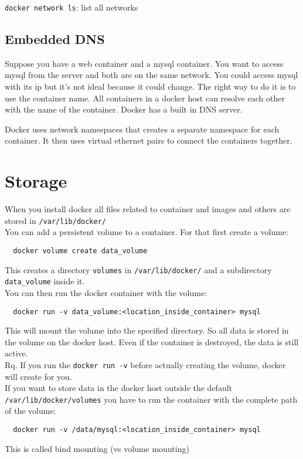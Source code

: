 \documentclass[french]{article}
\begin{document}
\verb|docker network ls|: list all networks

\subsection{Embedded DNS}

Suppose you have a web container and a mysql container. You want to access mysql from the server and both are on the same network. You could access mysql with its ip but it's not ideal because it could change. The right way to do it is to use the container name. All containers in a docker host can resolve each other with the name of the container. Docker has a built in DNS server.

Docker uses network namespaces that creates a separate namespace for each container. It then uses virtual ethernet pairs to connect the containers together.

\section{Storage}

When you install docker all files related to container and images and others are stored in \verb|/var/lib/docker/|\\

You can add a persistent volume to a container. For that first create a volume:
\begin{verbatim}
  docker volume create data_volume
\end{verbatim}
This creates a directory \verb|volumes| in \verb|/var/lib/docker/| and a subdirectory \verb|data_volume| inside it.\\

You can then run the docker container with the volume:
\begin{verbatim}
  docker run -v data_volume:<location_inside_container> mysql
\end{verbatim}
This will mount the volume into the specified directory. So all data is stored in the volume on the docker host. Even if the container is destroyed, the data is still active.\\

Rq. If you run the \verb|docker run -v| before actually creating the volume, docker will create for you.\\

If you want to store data in the docker host outside the default \verb|/var/lib/docker/volumes| you have to run the container with the complete path of the volume:
\begin{verbatim}
  docker run -v /data/mysql:<location_inside_container> mysql
\end{verbatim}
This is called bind mounting (vs volume mounting)\\
\end{document}
